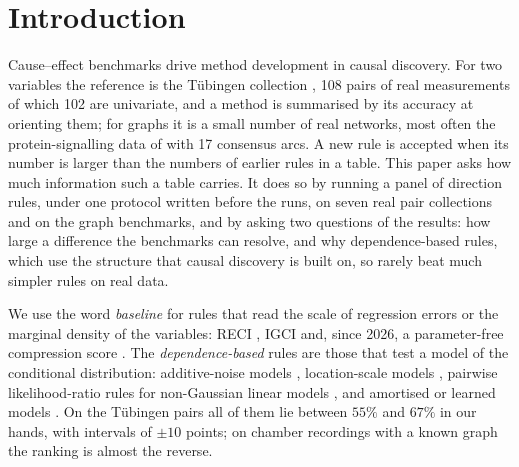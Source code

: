 \section{Introduction}\label{sec:intro}

Cause--effect benchmarks drive method development in causal discovery. For two variables the reference is the T\"ubingen collection \citep{mooij2016distinguishing}, 108 pairs of real measurements of which 102 are univariate, and a method is summarised by its accuracy at orienting them; for graphs it is a small number of real networks, most often the protein-signalling data of \citet{sachs2005causal} with 17 consensus arcs. A new rule is accepted when its number is larger than the numbers of earlier rules in a table. This paper asks how much information such a table carries. It does so by running a panel of direction rules, under one protocol written before the runs, on seven real pair collections and on the graph benchmarks, and by asking two questions of the results: how large a difference the benchmarks can resolve, and why dependence-based rules, which use the structure that causal discovery is built on, so rarely beat much simpler rules on real data.

We use the word \emph{baseline} for rules that read the scale of regression errors or the marginal density of the variables: RECI \citep{blobaum2018cause}, IGCI \citep{daniusis2010inferring} and, since 2026, a parameter-free compression score \citep{stienstra2026oneruler}. The \emph{dependence-based} rules are those that test a model of the conditional distribution: additive-noise models \citep{hoyer2009nonlinear,peters2014identifiability}, location-scale models \citep{immer2023loci}, pairwise likelihood-ratio rules for non-Gaussian linear models \citep{hyvarinen2013pairwise}, and amortised or learned models \citep{lorch2022amortized}. On the T\"ubingen pairs all of them lie between $55\%$ and $67\%$ in our hands, with intervals of $\pm 10$ points; on chamber recordings with a known graph the ranking is almost the reverse.

